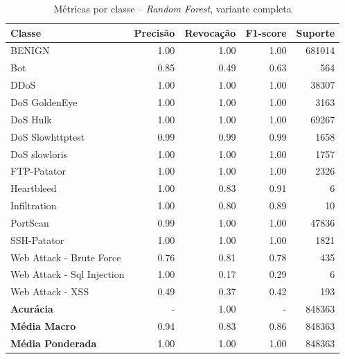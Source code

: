 \begin{table}[H]
    \centering
    \small
    \begin{tabular}{lrrrr}
        \hline
        Classe                     & Precisão & Revocação & F1-score & Suporte \\
        \hline
        BENIGN                     & 1.00     & 1.00      & 1.00     & 681014  \\
        Bot                        & 0.85     & 0.49      & 0.63     & 564     \\
        DDoS                       & 1.00     & 1.00      & 1.00     & 38307   \\
        DoS GoldenEye              & 1.00     & 1.00      & 1.00     & 3163    \\
        DoS Hulk                   & 1.00     & 1.00      & 1.00     & 69267   \\
        DoS Slowhttptest           & 0.99     & 0.99      & 0.99     & 1658    \\
        DoS slowloris              & 1.00     & 1.00      & 1.00     & 1757    \\
        FTP-Patator                & 1.00     & 1.00      & 1.00     & 2326    \\
        Heartbleed                 & 1.00     & 0.83      & 0.91     & 6       \\
        Infiltration               & 1.00     & 0.80      & 0.89     & 10      \\
        PortScan                   & 0.99     & 1.00      & 1.00     & 47836   \\
        SSH-Patator                & 1.00     & 1.00      & 1.00     & 1821    \\
        Web Attack - Brute Force   & 0.76     & 0.81      & 0.78     & 435     \\
        Web Attack - Sql Injection & 1.00     & 0.17      & 0.29     & 6       \\
        Web Attack - XSS           & 0.49     & 0.37      & 0.42     & 193     \\
        \hline
        \textbf{Acurácia}          & -        & 1.00      & -        & 848363  \\
        \textbf{Média Macro}       & 0.94     & 0.83      & 0.86     & 848363  \\
        \textbf{Média Ponderada}   & 1.00     & 1.00      & 1.00     & 848363  \\
        \hline
    \end{tabular}
    \caption{Métricas por classe -- \textit{Random Forest}, variante completa}
    \label{table:rf_completo_metricas}
\end{table}